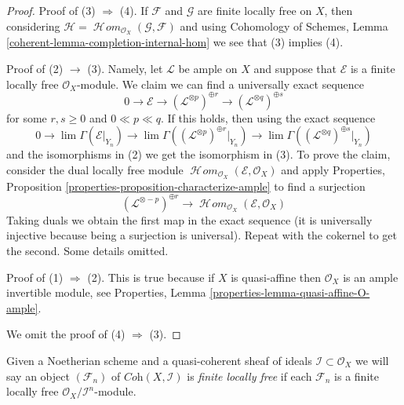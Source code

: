 \documentclass{stacks-project}
\theoremstyle{plain}
\theoremstyle{definition}
\theoremstyle{remark}
\numberwithin{equation}{subsection}
\def\lim{\mathop{\mathrm{lim}}\nolimits}
\def\SheafHom{\mathop{\mathcal{H}\!\mathit{om}}\nolimits}
\begin{document}
\begin{proof}
Proof of (3) $\Rightarrow$ (4). If $\mathcal{F}$ and $\mathcal{G}$
are finite locally free on $X$, then considering
$\mathcal{H} = \SheafHom_{\mathcal{O}_X}(\mathcal{G}, \mathcal{F})$
and using Cohomology of Schemes, Lemma
\ref{coherent-lemma-completion-internal-hom}
we see that (3) implies (4).

\medskip\noindent
Proof of (2) $\rightarrow$ (3). Namely, let $\mathcal{L}$ be ample
on $X$ and suppose that $\mathcal{E}$ is a
finite locally free $\mathcal{O}_X$-module.
We claim we can find a universally exact sequence
$$
0 \to \mathcal{E} \to
(\mathcal{L}^{\otimes p})^{\oplus r} \to
(\mathcal{L}^{\otimes q})^{\oplus s}
$$
for some $r, s \geq 0$ and $0 \ll p \ll q$. If this holds, then
using the exact sequence
$$
0 \to \lim \Gamma(\mathcal{E}|_{Y_n}) \to
\lim \Gamma((\mathcal{L}^{\otimes p})^{\oplus r}|_{Y_n}) \to
\lim \Gamma((\mathcal{L}^{\otimes q})^{\oplus s}|_{Y_n})
$$
and the isomorphisms in (2) we get the isomorphism in (3).
To prove the claim, consider the dual locally free module
$\SheafHom_{\mathcal{O}_X}(\mathcal{E}, \mathcal{O}_X)$
and apply
Properties, Proposition \ref{properties-proposition-characterize-ample}
to find a surjection
$$
(\mathcal{L}^{\otimes -p})^{\oplus r}
\longrightarrow
\SheafHom_{\mathcal{O}_X}(\mathcal{E}, \mathcal{O}_X)
$$
Taking duals we obtain the first map in the exact sequence
(it is universally injective because being a surjection is universal).
Repeat with the cokernel to get the second. Some details omitted.

\medskip\noindent
Proof of (1) $\Rightarrow$ (2). This is true because if $X$ is quasi-affine
then $\mathcal{O}_X$ is an ample invertible module, see
Properties, Lemma \ref{properties-lemma-quasi-affine-O-ample}.

\medskip\noindent
We omit the proof of (4) $\Rightarrow$ (3).
\end{proof}

\noindent
Given a Noetherian scheme and a quasi-coherent sheaf of ideals
$\mathcal{I} \subset \mathcal{O}_X$ we will say
an object $(\mathcal{F}_n)$ of $\textit{Coh}(X, \mathcal{I})$
is {\it finite locally free} if each $\mathcal{F}_n$ is a finite
locally free $\mathcal{O}_X/\mathcal{I}^n$-module.
\end{document}

